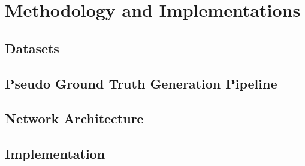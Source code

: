 %
%
% 
% 
% 



\chapter{Methodology and Implementations}
\label{chap:Style}
\section{Datasets}
\section{Pseudo Ground Truth Generation Pipeline}
\section{Network Architecture}
\section{Implementation}


